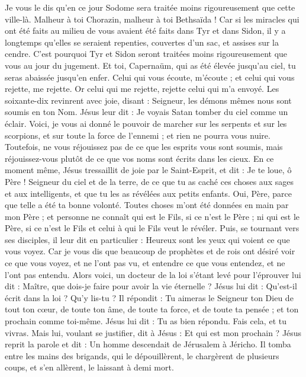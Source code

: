 \begin{multicols}{2}
{Je vous le dis qu'en ce jour Sodome sera traitée moins rigoureusement que cette ville-là.
Malheur à toi Chorazin, malheur à toi Bethsaïda ! Car si les miracles qui ont été faits au milieu de vous avaient été faits dans Tyr et dans Sidon, il y a longtemps qu'elles se seraient repenties, couvertes d'un sac, et assises sur la cendre.
C'est pourquoi Tyr et Sidon seront traitées moins rigoureusement que vous au jour du jugement.
Et toi, Capernaüm, qui as été élevée jusqu'au ciel, tu seras abaissée jusqu’en enfer.
Celui qui vous écoute, m'écoute ; et celui qui vous rejette, me rejette. Or celui qui me rejette, rejette celui qui m’a envoyé.
Les soixante-dix revinrent avec joie, disant : Seigneur, les démons mêmes nous sont soumis en ton Nom.
Jésus leur dit : Je voyais Satan tomber du ciel comme un éclair.
Voici, je vous ai donné le pouvoir de marcher sur les serpents et sur les scorpions, et sur toute la force de l'ennemi ; et rien ne pourra vous nuire.
Toutefois, ne vous réjouissez pas de ce que les esprits vous sont soumis, mais réjouissez-vous plutôt de ce que vos noms sont écrits dans les cieux.
En ce moment même, Jésus tressaillit de joie par le Saint-Esprit, et dit : Je te loue, ô Père ! Seigneur du ciel et de la terre, de ce que tu as caché ces choses aux sages et aux intelligents, et que tu les as révélées aux petits enfants. Oui, Père, parce que telle a été ta bonne volonté.
Toutes choses m'ont été données en main par mon Père ; et personne ne connaît qui est le Fils, si ce n’est le Père ; ni qui est le Père, si ce n’est le Fils et celui à qui le Fils veut le révéler.
Puis, se tournant vers ses disciples, il leur dit en particulier : Heureux sont les yeux qui voient ce que vous voyez.
Car je vous dis que beaucoup de prophètes et de rois ont désiré voir ce que vous voyez, et ne l’ont pas vu, et entendre ce que vous entendez, et ne l’ont pas entendu.
Alors voici, un docteur de la loi s'étant levé pour l'éprouver lui dit : Maître, que dois-je faire pour avoir la vie éternelle ?
Jésus lui dit : Qu'est-il écrit dans la loi ? Qu’y lis-tu ?
Il répondit : Tu aimeras le Seigneur ton Dieu de tout ton cœur, de toute ton âme, de toute ta force, et de toute ta pensée ; et ton prochain comme toi-même.
Jésus lui dit : Tu as bien répondu. Fais cela, et tu vivras.
Mais lui, voulant se justifier, dit à Jésus : Et qui est mon prochain ?
Jésus reprit la parole et dit : Un homme descendait de Jérusalem à Jéricho. Il tomba entre les mains des brigands, qui le dépouillèrent, le chargèrent de plusieurs coups, et s’en allèrent, le laissant à demi mort.
}
\end{multicols}
